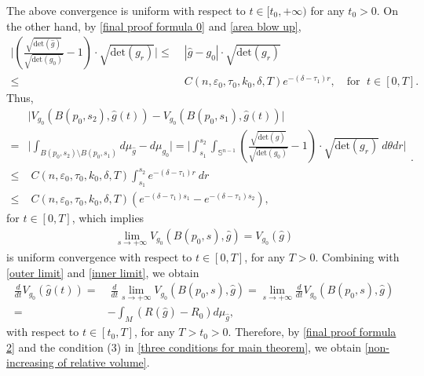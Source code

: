 \documentclass[12pt]{amsart}
\begin{document}
The above convergence is uniform with respect to $t\in [t_0, +\infty)$ for any $t_0 > 0$. On the other hand, by \eqref{final proof formula 0} and \eqref{area blow up}, 
\begin{equation}\label{volume converge precursor}
    \begin{split}
        \Big|(\frac{\sqrt{\mathrm{det}(\hat{g})}}{\sqrt{\mathrm{det}(g_0)}} - 1) \cdot\sqrt{\mathrm{det}(g_r)}\Big| \leq&\; |\hat{g} - g_0| \cdot \sqrt{\mathrm{det}(g_r)} \\
        \leq&\; C(n,\varepsilon_0,\tau_0, k_0, \delta, T) e^{-(\delta - \tau_1)r},\quad \text{for }\; t\in [0, T]. 
    \end{split}
\end{equation}
Thus, 
\begin{equation}
    \begin{split}
        &\Big|V_{g_0}(B(p_0, s_2), \hat{g}(t)) - V_{g_0}(B(p_0, s_1), \hat{g}(t))\Big|\\
        =& \Big|\int_{B(p_0, s_2)\setminus B(p_0, s_1)} d\mu_{\hat{g}} - d\mu_{g_0}\Big| = \Big|\int_{s_1}^{s_2}\int_{\mathbb{S}^{n - 1}} (\frac{\sqrt{\mathrm{det}(\hat{g})}}{\sqrt{\mathrm{det}(g_0)}} - 1) \cdot\sqrt{\mathrm{det}(g_r)}\ d\theta dr \Big|\\
        \leq&\; C(n,\varepsilon_0,\tau_0, k_0, \delta, T) \int_{s_1}^{s_2}e^{- (\delta - \tau_1) r}\  dr\\
        \leq&\; C(n,\varepsilon_0,\tau_0, k_0, \delta, T)(e^{-(\delta - \tau_1)s_1} - e^{-(\delta - \tau_1)s_2}),
    \end{split}. 
\end{equation}
for $t\in [0, T]$, which implies 
\begin{align}\label{inner limit}
    \lim_{s \rightarrow +\infty} V_{g_0}(B(p_0, s), \hat{g}) = V_{g_0}(\hat{g})
\end{align}
is uniform convergence with respect to $t\in [0, T]$, for any $T > 0$. Combining with \eqref{outer limit} and \eqref{inner limit}, we obtain 
\begin{equation}\label{final proof formula 2}
    \begin{split}
        \frac{d}{dt}V_{g_0}(\hat{g}(t)) =&\; 
        \frac{d}{dt}\lim_{s\rightarrow +\infty}V_{g_0}(B(p_0, s), \hat{g})= \lim_{s\rightarrow +\infty} \frac{d}{dt} V_{g_0}(B(p_0, s), \hat{g})\\ 
        =& -\int_{M}(R(\hat{g}) - R_0)d\mu_{\hat{g}}, 
    \end{split}
\end{equation} 
with respect to $t\in [t_0, T]$, for any $T > t_0 > 0$. Therefore, by \eqref{final proof formula 2} and the condition (3) in \eqref{three conditions for main theorem}, we obtain \eqref{non-increasing of relative volume}. 
\end{document}
